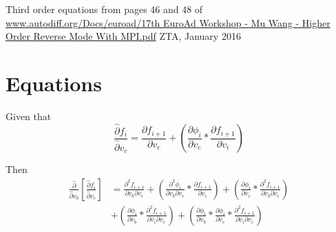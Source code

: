 \documentclass[12pt,letter]{article}
\begin{document}
	\thispagestyle{empty}
	\begin{center}
	Third order equations from pages 46 and 48 of
	\url{www.autodiff.org/Docs/euroad/17th EuroAd Workshop - Mu Wang - Higher Order Reverse Mode With MPI.pdf}
	ZTA, January 2016
	\end{center}
	\clearpage
	
	\newpage
	\section{Equations}
	Given that
	\begin{equation}
	\frac{\hat{\partial} f_i}{\hat{\partial} v_c} = 
	\frac{\partial f_{i+1}}{\partial v_c} + 
	\left(\frac{\partial \phi_i}{\partial v_c} * \frac{\partial f_{i+1}}{\partial v_i}\right)
	\end{equation}
	
	Then
	\begin{equation}
	\begin{split}
	\frac{\hat{\partial}}{\hat{\partial} v_b}\left[\frac{\hat{\partial} f_i}{\hat{\partial} v_c}\right] &=
	\frac{\partial^2 f_{i+1}}{\partial v_b \partial v_c} +
	\left(\frac{\partial^2 \phi_i}{\partial v_b \partial v_c} * \frac{\partial f_{i+1}}{\partial v_i} \right) +
	\left(\frac{\partial\phi_i}{\partial v_c} * \frac{\partial^2 f_{i+1}}{\partial v_b \partial v_i}\right)
	\\
	&+ \left(\frac{\partial\phi_i}{\partial v_b} * \frac{\partial^2 f_{i+1}}{\partial v_i \partial v_c}\right) + 
	\left(\frac{\partial\phi_i}{\partial v_b} * \frac{\partial\phi_i}{\partial v_c} * \frac{\partial^2 f_{i+1}}{\partial v_i \partial v_i}\right)
	\end{split}
	\end{equation}
	
\end{document}
